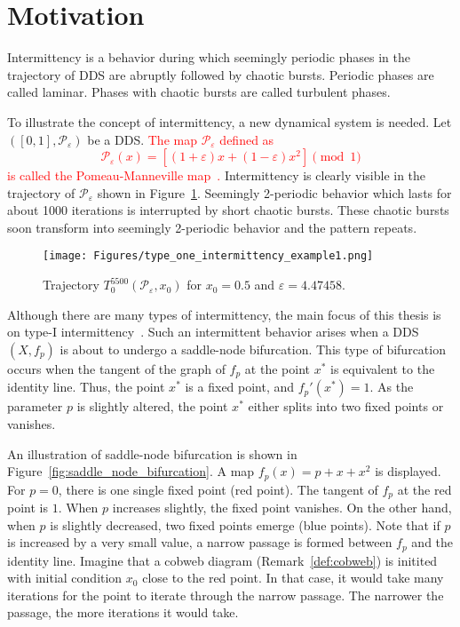 \section{Motivation}
Intermittency is a behavior during which seemingly periodic phases in the trajectory of DDS are abruptly followed by chaotic bursts.
Periodic phases are called laminar.
Phases with chaotic bursts are called turbulent phases.
\par
To illustrate the concept of intermittency, a new dynamical system is needed.
Let $([0, 1], \mathcal{P}_{\varepsilon})$ be a DDS.
\textcolor{red}{The map $\mathcal{P}_{\varepsilon}$ defined as 
\begin{equation}
    \mathcal{P}_{\varepsilon}(x) = \left[ (1+\varepsilon)x+(1-\varepsilon)x^2 \right] \pmod{1} \label{pommeau_manneville_map}
\end{equation}
is called the Pomeau-Manneville map~\cite{Manneville1980,Datseris2022}.}
Intermittency is clearly visible in the trajectory of $\mathcal{P}_{\varepsilon}$ shown in Figure~\ref{fig:intermittent_trajectory_example}.
Seemingly 2-periodic behavior which lasts for about 1000 iterations is interrupted by short chaotic bursts.
These chaotic bursts soon transform into seemingly 2-periodic behavior and the pattern repeats.

\begin{figure}[!h]
    \centering
    \texttt{[image: Figures/type\_one\_intermittency\_example1.png]}
    \caption{
        Trajectory $T^{5500}_{0}(\mathcal{P}_{\varepsilon}, x_0)$ for $x_0 = 0.5$ and $\varepsilon = 4.47458$.
    }
    \label{fig:intermittent_trajectory_example}
\end{figure}

Although there are many types of intermittency, the main focus of this thesis is on type-I intermittency~\cite{Pomeau1980,Bussac1982,DelRio2014}.
Such an intermittent behavior arises when a DDS $(X, f_{p})$ is about to undergo a saddle-node bifurcation.
This type of bifurcation occurs when the tangent of the graph of $f_{p}$ at the point $x^{*}$ is equivalent to the identity line.
Thus, the point $x^{*}$ is a fixed point, and $f_{p}'(x^{*}) = 1$.
As the parameter $p$ is slightly altered, the point $x^{*}$ either splits into two fixed points or vanishes.
\par
An illustration of saddle-node bifurcation is shown in Figure~\ref{fig:saddle_node_bifurcation}.
A map $f_{p}(x) = p + x + x^2$ is displayed.
For $p = 0$, there is one single fixed point (red point).
The tangent of $f_{p}$ at the red point is $1$.
When $p$ increases slightly, the fixed point vanishes.
On the other hand, when $p$ is slightly decreased, two fixed points emerge (blue points).
Note that if $p$ is increased by a very small value, a narrow passage is formed between $f_{p}$ and the identity line.
Imagine that a cobweb diagram (Remark~\ref{def:cobweb}) is initited with initial condition $x_0$ close to the red point.
In that case, it would take many iterations for the point to iterate through the narrow passage.
The narrower the passage, the more iterations it would take.


